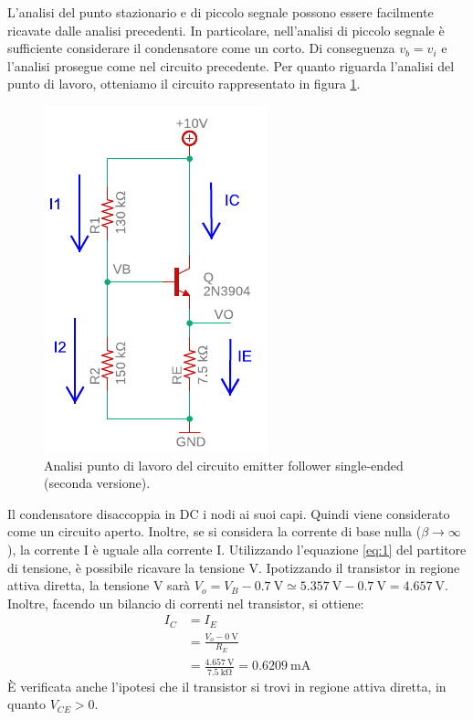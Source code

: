 \noindent
L'analisi del punto stazionario e di piccolo segnale possono essere facilmente ricavate dalle analisi precedenti. In particolare, nell'analisi di piccolo segnale è sufficiente considerare il condensatore come un corto. Di conseguenza $v_b=v_i$ e l'analisi prosegue come nel circuito precedente. Per quanto riguarda l'analisi del punto di lavoro, otteniamo il circuito rappresentato in figura \ref{fig:emitterfollwer_v2_DC}. 
\begin{figure}[h!]
	\centering
	\includegraphics[width=0.4\linewidth]{./OtherFiles/Laboratorio 2/emitter follower_v2_punto di lavoro-printout}
	\caption{Analisi punto di lavoro del circuito emitter follower single-ended (seconda versione).}
	\label{fig:emitterfollwer_v2_DC}
\end{figure}
Il condensatore disaccoppia in DC i nodi ai suoi capi. Quindi viene considerato come un circuito aperto. Inoltre, se si considera la corrente di base nulla ($\beta\to\infty$), la corrente I è uguale alla corrente I. Utilizzando l'equazione \ref{eq:1} del partitore di tensione, è possibile ricavare la tensione V. Ipotizzando il transistor in regione attiva diretta, la tensione V sarà $V_o=V_B-\SI{0.7}{\volt}\simeq\SI{5.357}{\volt}-\SI{0.7}{\volt}=\SI{4.657}{\volt}$. Inoltre, facendo un bilancio di correnti nel transistor, si ottiene:
\begin{equation}
	\begin{split}
		I_C&=I_E \\
		&=\frac{V_o-\SI{0}{\volt}}{R_E} \\
		&=\frac{\SI{4.657}{\volt}}{\SI{7.5}{\kilo\ohm}}=\SI{0.6209}{\milli\ampere}
	\end{split}
\end{equation}
\`E verificata anche l'ipotesi che il transistor si trovi in regione attiva diretta, in quanto $V_{CE}>0$.

